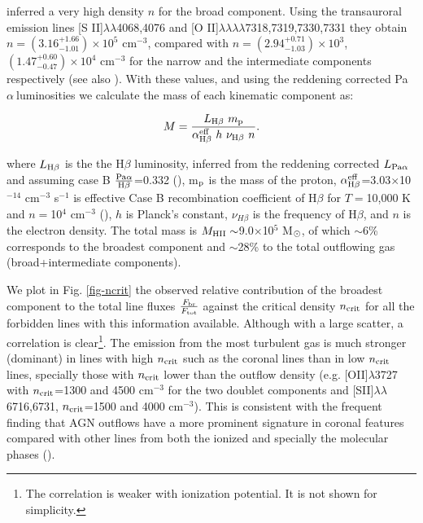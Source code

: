 \documentclass{aa}
\newcommand{\pa}{Pa$\alpha~$}
\begin{document}
 \cite{Holt2011}  inferred a very high density $n$ for the broad component. Using the  transauroral emission
lines [S II]$\lambda\lambda$4068,4076 and [O II]$\lambda\lambda\lambda\lambda$7318,7319,7330,7331 they obtain  $n=(3.16^{+1.66}_{-1.01})\times 10^5$ cm$^{-3}$,  compared with $n=(2.94^{+0.71}_{-1.03})\times 10^3$, $(1.47^{+0.60}_{-0.47})\times 10^4$  cm$^{-3}$ for the narrow and the intermediate components respectively (see also \citealt{Rose2018}).   With these values, and using the reddening corrected \pa luminosities we calculate the mass of each kinematic component as:

\begin{equation}
M = \frac{L_{\rm H\beta}~m_{\rm p}}{\alpha_{\rm H\beta}^{\rm eff}~h~ \nu_{\rm H\beta}~n} .
\label{eqn:masstot2}
\end{equation}

\noindent where $L_{\rm H\beta}$ is the the H$\beta$ luminosity,  inferred from the reddening corrected $L_{\rm Pa\alpha}$ and assuming case B $\frac{\rm Pa\alpha}{\rm H\beta}$=0.332 (\citealt{Osterbrock2006}), m$_{\rm p}$ is the mass of the proton, $\alpha_{\rm H\beta}^{\rm eff}$=3.03$\times$10$^{-14}$  cm$^{-3}$ s$^{-1}$ is effective Case B recombination coefficient of H$\beta$ for $T=$10,000 K and $n=$10$^4$ cm$^{-3}$ (\citealt{Osterbrock2006}), $h$ is Planck's constant, $\nu_{H\beta}$ is the frequency of H$\beta$, and $n$ is the electron density. The total  mass is $M_{\rm HII}\sim$9.0$\times$10$^5$ M$_{\rm \odot}$, of which $\sim$6\% corresponds to the broadest component and $\sim$28\% to the total outflowing gas (broad+intermediate components). 


We plot in Fig. \ref{fig-ncrit} the observed relative contribution  of the broadest component to the total line fluxes $\frac{F_{\rm br}}{F_{\rm tot}}$ against the critical density $n_{\rm crit}$ for all the forbidden lines with this information available. Although with a large scatter, a correlation is clear\footnote{The correlation is weaker with ionization potential. It is not shown for simplicity.}. 
The  emission from the most turbulent gas is  much  stronger (dominant) in  lines with high  $n_{\rm crit}$ such as the coronal lines than in  low  $n_{\rm crit}$ lines, specially those with $n_{\rm crit}$  lower than the outflow density (e.g. [OII]$\lambda$3727 with $n_{\rm crit}$=1300 and 4500 cm$^{-3}$ for the two doublet components and [SII]$\lambda\lambda$6716,6731, $n_{\rm crit}$=1500 and 4000 cm$^{-3}$).   This is consistent  with the frequent finding that AGN outflows have a more prominent signature in coronal features compared with  other lines from both the ionized and specially the molecular phases (\citealt{DeRobertis1984,Ardila2002,Alvarez2023}).  
\end{document}
